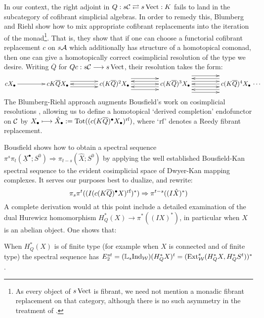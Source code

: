 \documentclass[10pt]{article}
\newcommand{\Comm}{\calC}
\begin{document}
\begin{AdamsDerivation}
In our context, the right adjoint in $Q:s\Comm\rightleftarrows s\Vect:K$ fails to land in the subcategory of cofibrant simplicial algebras. In order to remedy this, Blumberg and Riehl show how to mix appropriate cofibrant replacements into the iteration of the monad\footnote{As every object of $s\Vect$ is fibrant, we need not mention a monadic fibrant replacement on that category, although there is no such asymmetry in the treatment of \cite{BlumRiehlResolutions.pdf}.}. That is, they show that if one can choose a functorial cofibrant replacement $c$ on $\ensuremath{s\calA}$ which additionally has structure of a homotopical comonad, then one can give a homotopically correct cosimplicial resolution of the type we desire. Writing $\overline{Q}$ for $Qc:s\Comm\to s\Vect$, their resolution takes the form:
\[
\vcenter{
\def\labelstyle{\scriptstyle}
\xymatrix@C=1.5cm@1{
cX_\bullet\,
\ar[r]
&
\,cK\overline{Q}X_\bullet\,
\ar[r];[]
&
\,c(K\overline{Q})^2X_\bullet\,
\ar@<-1ex>[l];[]
\ar@<+1ex>[l];[]
\ar@<+1ex>[r];[]
\ar@<-1ex>[r];[]
&
\,c(K\overline{Q})^3X_\bullet\,
\ar[l];[]
\ar@<-2ex>[l];[]
\ar@<+2ex>[l];[]
\ar[r];[]
\ar@<+2ex>[r];[]
\ar@<-2ex>[r];[]
&
\,c(K\overline{Q})^4X_\bullet\,\makebox[0cm][l]{\,$\cdots $}
\ar@<-3ex>[l];[]
\ar@<-1ex>[l];[]
\ar@<+1ex>[l];[]
\ar@<+3ex>[l];[]
}}\]
The Blumberg-Riehl approach augments Bousfield's work on cosimplicial resolutions \cite{BousCosimpResnHtpySS.pdf},  allowing us to define a homotopical `derived completion' endofunctor on $\Comm$ by $X_\bullet\mapsto\hat X_\bullet:=\textup{Tot}((c(K\overline{Q})^\bullet X_\bullet)^{\textup{rf}})$, where `$\textup{rf}$' denotes a Reedy fibrant replacement.

Bousfield shows how to obtain a spectral sequence $\pi^s\pi_t(\underline{X}^\bullet;S^0)\Rightarrow\pi_{t-s}(\hat X;S^0)$ by applying the well established Bousfield-Kan spectral sequence to the evident cosimplicial space of Dwyer-Kan mapping complexes. It serves our purposes best to dualize, and rewrite:
\[\pi_s\pi^t((I(c(K\overline{Q})^\bullet X)^{\textup{rf}})^*)\Rightarrow \pi^{t-s}((I\hat X)^*)\]
A complete derivation would at this point include a detailed examination of the dual Hurewicz homomorphism $H^*_Q(X)\to \pi^*((IX)^*)$, in particular when $X$ is an abelian object. One shows that:
\begin{prop}
When $H^*_Q(X)$ is of finite type (for example when $X$ is connected and of finite type) the spectral sequence has $E_2^{st}=(\mathbb{L}_s\textup{Ind}_\calW)(H_Q^*X)^t=(\Ext^s_{\calW}(H_Q^*X,H_Q^*S^t))^*$.
\end{prop}


\end{AdamsDerivation}
\end{document}
